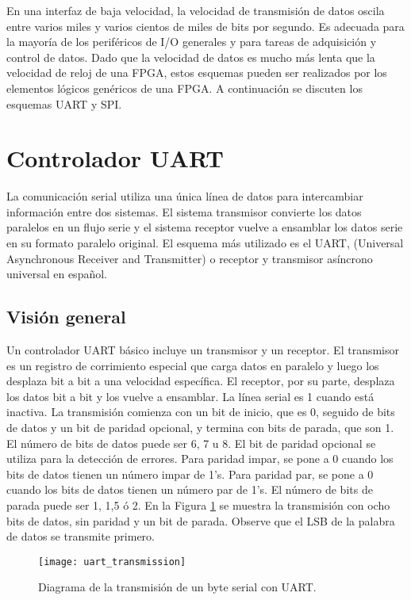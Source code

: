     En una interfaz de baja velocidad, la velocidad de transmisión de datos oscila entre varios miles y varios cientos de miles de bits por segundo. Es adecuada para la mayoría de los periféricos de I/O generales y para tareas de adquisición y control de datos. Dado que la velocidad de datos es mucho más lenta que la velocidad de reloj de una FPGA, estos esquemas pueden ser realizados por los elementos lógicos genéricos de una FPGA. A continuación se discuten los esquemas UART y SPI.

	\section{Controlador UART}

    La comunicación serial utiliza una única línea de datos para intercambiar información entre dos sistemas. El sistema transmisor convierte los datos paralelos en un flujo serie y el sistema receptor vuelve a ensamblar los datos serie en su formato paralelo original. El esquema más utilizado es el UART, (Universal Asynchronous Receiver and Transmitter) o receptor y transmisor asíncrono universal en español.

    \subsection{Visión general}

    Un controlador UART básico incluye un transmisor y un receptor. El transmisor es un registro de corrimiento especial que carga datos en paralelo y luego los desplaza bit a bit a una velocidad específica. El receptor, por su parte, desplaza los datos bit a bit y los vuelve a ensamblar. La línea serial es 1 cuando está inactiva. La transmisión comienza con un bit de inicio, que es 0, seguido de bits de datos y un bit de paridad opcional, y termina con bits de parada, que son 1. El número de bits de datos puede ser 6, 7 u 8. El bit de paridad opcional se utiliza para la detección de errores. Para paridad impar, se pone a 0 cuando los bits de datos tienen un número impar de 1's. Para paridad par, se pone a 0 cuando los bits de datos tienen un número par de 1's. El número de bits de parada puede ser 1, 1,5 ó 2. En la Figura \ref{fig:uart_transmission} se muestra la transmisión con ocho bits de datos, sin paridad y un bit de parada. Observe que el LSB de la palabra de datos se transmite primero.

    \begin{figure}[hbtp]
      \centering
      \texttt{[image: uart\_transmission]}
      \caption{Diagrama de la transmisión de un byte serial con UART.}
      \label{fig:uart_transmission}
    \end{figure}

